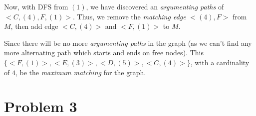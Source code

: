 \documentclass[11pt]{article}
\begin{document}
Now, with DFS from $(1)$, we have discovered an \textit{argumenting paths} of $<C, (4), F, (1)>$. Thus, we remove the \textit{matching edge} $<(4), F>$ from $M$, then add edge $<C, (4)>$ and $<F, (1)>$ to $M$.\newline

Since there will be no more \textit{argumenting paths} in the graph (as we can't find any more alternating path which starts and ends on free nodes). This $\{ <F, (1)>, <E, (3)>, <D, (5)>, <C, (4)> \}$, with a cardinality of $4$, be the \textit{maximum matching} for the graph.

\section{Problem 3}


%
% 
% 
\end{document}
